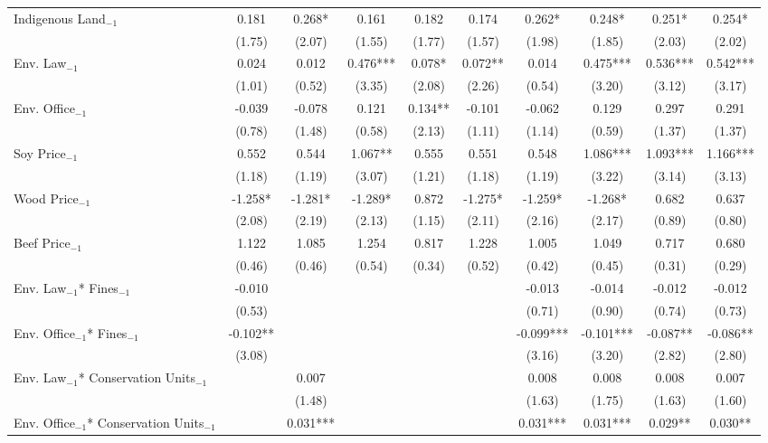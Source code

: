 \begin{landscape}
\begin{table}[htpb!]
\begin{tabularx}{0.82\linewidth}{l C C C C C C C C C}
    Indigenous Land$_{-1}$& 0.181	&	0.268*	&	0.161	&	0.182	&	0.174	&	0.262*	&	0.248*	&	0.251*	&	0.254*	\\
                    & 		(1.75)	&	(2.07)	&	(1.55)	&	(1.77)	&	(1.57)	&	(1.98)	&	(1.85)	&	(2.03)	&	(2.02)	\\
    Env. Law$_{-1}$ & 	0.024	&	0.012	&	0.476***	&	0.078*	&	0.072**	&	0.014	&	0.475***	&	0.536***	&	0.542***	\\
                    & 		(1.01)	&	(0.52)	&	(3.35)	&	(2.08)	&	(2.26)	&	(0.54)	&	(3.20)	&	(3.12)	&	(3.17)	\\
    Env. Office$_{-1}$&  -0.039	&	-0.078	&	0.121	&	0.134**	&	-0.101	&	-0.062	&	0.129	&	0.297	&	0.291	\\
                    & 		(0.78)	&	(1.48)	&	(0.58)	&	(2.13)	&	(1.11)	&	(1.14)	&	(0.59)	&	(1.37)	&	(1.37)	\\
    Soy Price$_{-1}$& 	0.552	&	0.544	&	1.067**	&	0.555	&	0.551	&	0.548	&	1.086***	&	1.093***	&	1.166***	\\
                    & 	(1.18)	&	(1.19)	&	(3.07)	&	(1.21)	&	(1.18)	&	(1.19)	&	(3.22)	&	(3.14)	&	(3.13)	\\
    Wood Price$_{-1}$& 	-1.258*	&	-1.281*	&	-1.289*	&	0.872	&	-1.275*	&	-1.259*	&	-1.268*	&	0.682	&	0.637	\\
                    & 		(2.08)	&	(2.19)	&	(2.13)	&	(1.15)	&	(2.11)	&	(2.16)	&	(2.17)	&	(0.89)	&	(0.80)	\\
    Beef Price$_{-1}$& 	1.122	&	1.085	&	1.254	&	0.817	&	1.228	&	1.005	&	1.049	&	0.717	&	0.680	\\
                    & 		(0.46)	&	(0.46)	&	(0.54)	&	(0.34)	&	(0.52)	&	(0.42)	&	(0.45)	&	(0.31)	&	(0.29)	\\
    Env. Law$_{-1}$* Fines$_{-1}$ & 	-0.010	&		&		&		&		&	-0.013	&	-0.014	&	-0.012	&	-0.012	\\
                    & 		(0.53)	&		&		&		&		&	(0.71)	&	(0.90)	&	(0.74)	&	(0.73)	\\
    Env. Office$_{-1}$* Fines$_{-1}$ & 	-0.102**	&		&		&		&		&	-0.099***	&	-0.101***	&	-0.087**	&	-0.086**	\\
                    & 		(3.08)	&		&		&		&		&	(3.16)	&	(3.20)	&	(2.82)	&	(2.80)	\\
    Env. Law$_{-1}$* Conservation Units$_{-1}$ & 		&	0.007	&		&		&		&	0.008	&	0.008	&	0.008	&	0.007	\\
                    & 			&	(1.48)	&		&		&		&	(1.63)	&	(1.75)	&	(1.63)	&	(1.60)	\\
    Env. Office$_{-1}$* Conservation Units$_{-1}$&		&	0.031***	&		&		&		&	0.031***	&	0.031***	&	0.029**	&	0.030**	\\

\end{tabularx}
\end{table}
\end{landscape}
